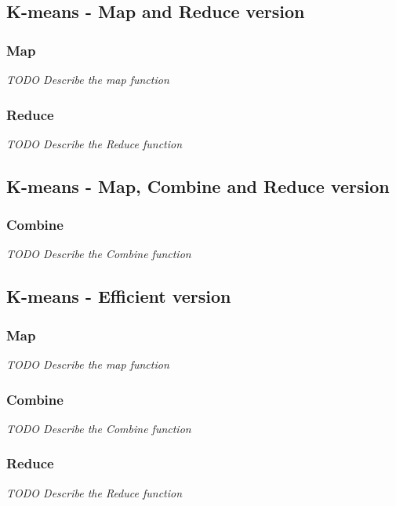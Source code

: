 \subsection{K-means - Map and Reduce version}
\lipsum[1]

\subsubsection{Map}
\textit{TODO Describe the map function}

\lipsum[1-2]


\subsubsection{Reduce}
\textit{TODO Describe the Reduce function}

\lipsum[7-8]

\subsection{K-means - Map, Combine and Reduce version}
\lipsum[1]

\subsubsection{Combine}
\textit{TODO Describe the Combine function}

\lipsum[5-6]

\subsection{K-means - Efficient version}
\lipsum[1]

\subsubsection{Map}
\textit{TODO Describe the map function}

\lipsum[1-2]

\subsubsection{Combine}
\textit{TODO Describe the Combine function}

\lipsum[5-6]


\subsubsection{Reduce}
\textit{TODO Describe the Reduce function}

